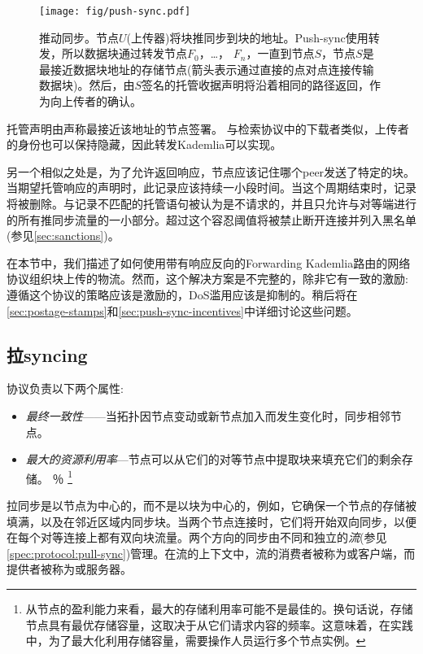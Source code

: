 \begin{figure}[htbp]
   \centering
   \texttt{[image: fig/push-sync.pdf]}
   \caption[推动同步\statusgreen]{推动同步。节点$U$(上传器)将块推同步到块的地址。Push-sync使用转发，所以数据块通过转发节点$F_0$，…， $F_n$，一直到节点$S$，节点$S$是最接近数据块地址的存储节点(箭头表示通过直接的点对点连接传输数据块)。然后，由$S$签名的托管收据声明将沿着相同的路径返回，作为向上传者的确认。}
   \label{fig:push-syncing}
\end{figure}

托管声明由声称最接近该地址的节点签署。
与检索协议中的下载者类似，上传者的身份也可以保持隐藏，因此转发Kademlia可以实现。

另一个相似之处是，为了允许返回响应，节点应该记住哪个peer发送了特定的块。当期望托管响应的声明时，此记录应该持续一小段时间。当这个周期结束时，记录将被删除。与记录不匹配的托管语句被认为是不请求的，并且只允许与对等端进行的所有推同步流量的一小部分。超过这个容忍阈值将被禁止断开连接并列入黑名单(参见\ref{sec:sanctions})。

在本节中，我们描述了如何使用带有响应反向的Forwarding Kademlia路由的网络协议组织块上传的物流。然而，这个解决方案是不完整的，除非它有一致的激励:遵循这个协议的策略应该是激励的，DoS滥用应该是抑制的。稍后将在\ref{sec:postage-stamps}和\ref{sec:push-sync-incentives}中详细讨论这些问题。

\subsection{拉syncing\statusgreen}\label{sec:pull-syncing}

协议负责以下两个属性: 

\begin{itemize}
    \item \emph{最终一致性}——当拓扑因节点变动或新节点加入而发生变化时，同步相邻节点。
    \item \emph{最大的资源利用率}—节点可以从它们的对等节点中提取块来填充它们的剩余存储。%
％
\footnote{从节点的盈利能力来看，最大的存储利用率可能不是最佳的。换句话说，存储节点具有最优存储容量，这取决于从它们请求内容的频率。这意味着，在实践中，为了最大化利用存储容量，需要操作人员运行多个节点实例。}
\end{itemize}

拉同步是以节点为中心的，而不是以块为中心的，例如，它确保一个节点的存储被填满，以及在邻近区域内同步块。当两个节点连接时，它们将开始双向同步，以便在每个对等连接上都有双向块流量。两个方向的同步由不同和独立的\emph{流}(参见\ref{spec:protocol:pull-sync})管理。在流的上下文中，流的消费者被称为或客户端，而提供者被称为或服务器。

